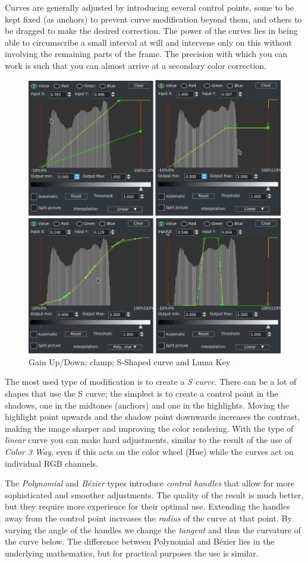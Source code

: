 Curves are generally adjusted by introducing several control points, some to be kept fixed (as anchors) to prevent curve modification beyond them, and others to be dragged to make the desired correction. The power of the curves lies in being able to circumscribe a small interval at will and intervene only on this without involving the remaining parts of the frame. The precision with which you can work is such that you can almost arrive at a secondary color correction.

\begin{figure}[htpb]
    \centering
    \includegraphics[width=0.75\linewidth]{images/ex-bezier.png}
    \caption{Gain Up/Down; clamp; S-Shaped curve and Luma Key}
    \label{fig:ex-bezier}
\end{figure}


The most used type of modification is to create a \textit{S curve}. There can be a lot of shapes that use the S curve; the simplest is to create a control point in the shadows, one in the midtones (anchors) and one in the highlights. Moving the highlight point upwards and the shadow point downwards increases the contrast, making the image sharper and improving the color rendering. With the type of \textit{linear} curve you can make hard adjustments, similar to the result of the use of \textit{Color 3 Way}, even if this acts on the color wheel (Hue) while the curves act on individual RGB channels.

The \textit{Polynomial} and \textit{Bézier} types introduce \textit{control handles} that allow for more sophisticated and smoother adjustments. The quality of the result is much better, but they require more experience for their optimal use. Extending the handles away from the control point increases the \textit{radius} of the curve at that point. By varying the angle of the handles we change the \textit{tangent} and thus the curvature of the curve below. The difference between Polynomial and Bézier lies in the underlying mathematics, but for practical purposes the use is similar.

